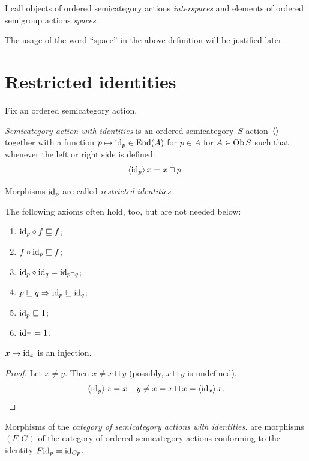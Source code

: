 \documentclass[a4paper,oneside,english,reqno]{amsart}
\begin{document}
\begin{defn}
I call objects of ordered semicategory actions \emph{interspaces} and elements of ordered semigroup actions \emph{spaces}.
\end{defn}

\begin{rem}
The usage of the word ``space'' in the above definition will be justified later.
\end{rem}

\section{Restricted identities}

Fix an ordered semicategory action.

\begin{defn}
\emph{Semicategory action with identities} is an ordered semicategory~$S$ action~$\left\langle \right\rangle$ together with a function $p\mapsto{\operatorname{id}}_p\in\operatorname{End}(A)$ for $p\in A$ for $A\in\operatorname{Ob} S$ such that whenever the left or right side is defined: \[ \left\langle {\operatorname{id}}_p\right\rangle x=x\sqcap p. \]

Morphisms ${\operatorname{id}}_p$ are called \emph{restricted identities}.
\end{defn}

\begin{rem}
The following axioms often hold, too, but are not needed below:
\begin{enumerate}
\item ${\operatorname{id}}_p\circ f\sqsubseteq f$;
\item $f\circ{\operatorname{id}}_p\sqsubseteq f$;
\item ${\operatorname{id}}_p\circ{\operatorname{id}}_q={\operatorname{id}}_{p\sqcap q}$;
\item $p\sqsubseteq q\Rightarrow{\operatorname{id}}_p\sqsubseteq{\operatorname{id}}_q$;
\item ${\operatorname{id}}_p\sqsubseteq 1$;
\item ${\operatorname{id}}_{\top}=1$.
\end{enumerate}
\end{rem}

\begin{prop}
\label{prop:id-inj}
$x\mapsto{\operatorname{id}}_x$ is an injection.
\end{prop}

\begin{proof}
Let $x\ne y$. Then $x\ne x\sqcap y$ (possibly, $x\sqcap y$ is undefined).
\[ \left\langle {\operatorname{id}}_y\right\rangle x=x\sqcap y\ne x=x\sqcap x=\left\langle {\operatorname{id}}_x\right\rangle x. \]
\end{proof}

\begin{defn}
Morphisms of the \emph{category of semicategory actions with identities.} are morphisms $(F,G)$ of the category of ordered semicategory actions conforming to the identity $F{\operatorname{id}}_p={\operatorname{id}}_{Gp}$.
\end{defn}
\end{document}
